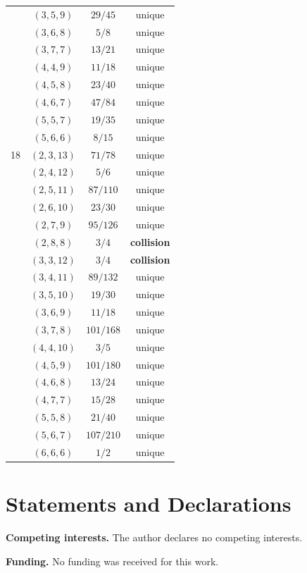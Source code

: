\documentclass[12pt, letterpaper]{article}
\theoremstyle{definition}
\theoremstyle{plain}
\begin{document}
\begin{longtable}{cccc}
   & $(3,5,9)$ & $29/45$ & unique \\
   & $(3,6,8)$ & $5/8$ & unique \\
   & $(3,7,7)$ & $13/21$ & unique \\
   & $(4,4,9)$ & $11/18$ & unique \\
   & $(4,5,8)$ & $23/40$ & unique \\
   & $(4,6,7)$ & $47/84$ & unique \\
   & $(5,5,7)$ & $19/35$ & unique \\
   & $(5,6,6)$ & $8/15$ & unique \\
\midrule
18 & $(2,3,13)$ & $71/78$ & unique \\
   & $(2,4,12)$ & $5/6$ & unique \\
   & $(2,5,11)$ & $87/110$ & unique \\
   & $(2,6,10)$ & $23/30$ & unique \\
   & $(2,7,9)$ & $95/126$ & unique \\
   & \textbf{$(2,8,8)$} & \textbf{$3/4$} & \textbf{collision} \\
   & \textbf{$(3,3,12)$} & \textbf{$3/4$} & \textbf{collision} \\
   & $(3,4,11)$ & $89/132$ & unique \\
   & $(3,5,10)$ & $19/30$ & unique \\
   & $(3,6,9)$ & $11/18$ & unique \\
   & $(3,7,8)$ & $101/168$ & unique \\
   & $(4,4,10)$ & $3/5$ & unique \\
   & $(4,5,9)$ & $101/180$ & unique \\
   & $(4,6,8)$ & $13/24$ & unique \\
   & $(4,7,7)$ & $15/28$ & unique \\
   & $(5,5,8)$ & $21/40$ & unique \\
   & $(5,6,7)$ & $107/210$ & unique \\
   & $(6,6,6)$ & $1/2$ & unique \\
\end{longtable}
\vspace{0.3cm}

\section*{Statements and Declarations}

\noindent\textbf{Competing interests.} The author declares no competing interests.

\smallskip
\noindent\textbf{Funding.} No funding was received for this work.
\end{document}
